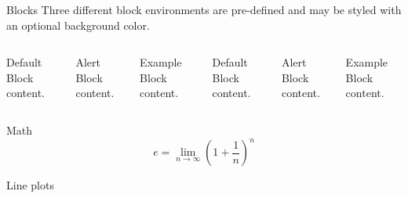 \begin{frame}{Blocks}
    Three different block environments are pre-defined and may be styled with an
    optional background color.

    \begin{columns}[T,onlytextwidth]
            \begin{block}{Default}
                Block content.
            \end{block}

            \begin{alertblock}{Alert}
                Block content.
            \end{alertblock}

            \begin{exampleblock}{Example}
                Block content.
            \end{exampleblock}



            \begin{block}{Default}
                Block content.
            \end{block}

            \begin{alertblock}{Alert}
                Block content.
            \end{alertblock}

            \begin{exampleblock}{Example}
                Block content.
            \end{exampleblock}

    \end{columns}
\end{frame}
\begin{frame}{Math}
    \begin{equation*}
        e = \lim_{n\to \infty} \left(1 + \frac{1}{n}\right)^n
    \end{equation*}
\end{frame}
\begin{frame}{Line plots}
    \begin{figure}
    \end{figure}
\end{frame}
